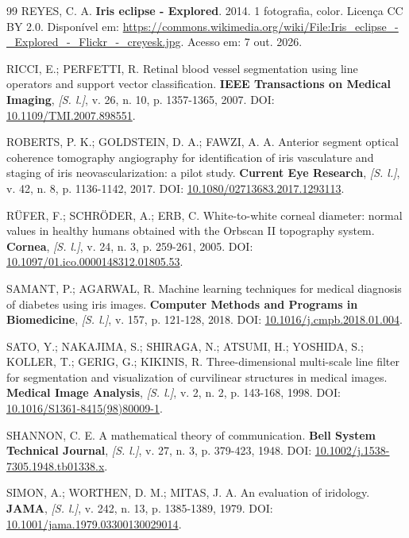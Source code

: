 \documentclass[12pt, oneside, a4paper, chapter=TITLE, section=TITLE,
               english, brazil]{abntex2}
\newcommand{\doi}[1]{DOI: \href{https://doi.org/#1}{#1}}
\newcommand{\semlocal}{\textit{[S. l.]}}
\begin{document}
\begin{thebibliography}{99}
REYES, C. A. \textbf{Iris eclipse - Explored}. 2014. 1 fotografia, color.
Licença CC BY 2.0. Disponível em:
\url{https://commons.wikimedia.org/wiki/File:Iris_eclipse_-_Explored_-_Flickr_-_creyesk.jpg}.
Acesso em: 7 out. 2026.

RICCI, E.; PERFETTI, R. Retinal blood vessel segmentation using line
operators and support vector classification. \textbf{IEEE Transactions on
Medical Imaging}, \semlocal, v. 26, n. 10, p. 1357-1365, 2007.
\doi{10.1109/TMI.2007.898551}.

ROBERTS, P. K.; GOLDSTEIN, D. A.; FAWZI, A. A. Anterior segment optical
coherence tomography angiography for identification of iris vasculature and
staging of iris neovascularization: a pilot study. \textbf{Current Eye
Research}, \semlocal, v. 42, n. 8, p. 1136-1142, 2017.
\doi{10.1080/02713683.2017.1293113}.

RÜFER, F.; SCHRÖDER, A.; ERB, C. White-to-white corneal diameter: normal
values in healthy humans obtained with the Orbscan II topography system.
\textbf{Cornea}, \semlocal, v. 24, n. 3, p. 259-261, 2005.
\doi{10.1097/01.ico.0000148312.01805.53}.

SAMANT, P.; AGARWAL, R. Machine learning techniques for medical diagnosis of
diabetes using iris images. \textbf{Computer Methods and Programs in
Biomedicine}, \semlocal, v. 157, p. 121-128, 2018.
\doi{10.1016/j.cmpb.2018.01.004}.

SATO, Y.; NAKAJIMA, S.; SHIRAGA, N.; ATSUMI, H.; YOSHIDA, S.; KOLLER, T.;
GERIG, G.; KIKINIS, R. Three-dimensional multi-scale line filter for
segmentation and visualization of curvilinear structures in medical images.
\textbf{Medical Image Analysis}, \semlocal, v. 2, n. 2, p. 143-168, 1998.
\doi{10.1016/S1361-8415(98)80009-1}.

SHANNON, C. E. A mathematical theory of communication. \textbf{Bell System
Technical Journal}, \semlocal, v. 27, n. 3, p. 379-423, 1948.
\doi{10.1002/j.1538-7305.1948.tb01338.x}.

SIMON, A.; WORTHEN, D. M.; MITAS, J. A. An evaluation of iridology.
\textbf{JAMA}, \semlocal, v. 242, n. 13, p. 1385-1389, 1979.
\doi{10.1001/jama.1979.03300130029014}.


\end{thebibliography}
\end{document}
